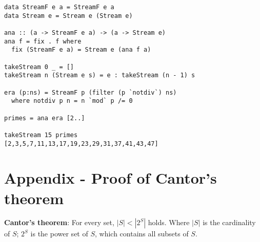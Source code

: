 \documentclass{article}
\begin{document}
\lstset{frame=single, language=Haskell}
\begin{lstlisting}
data StreamF e a = StreamF e a
data Stream e = Stream e (Stream e)

ana :: (a -> StreamF e a) -> (a -> Stream e)
ana f = fix . f where
  fix (StreamF e a) = Stream e (ana f a)

takeStream 0 _ = []
takeStream n (Stream e s) = e : takeStream (n - 1) s

era (p:ns) = StreamF p (filter (p `notdiv`) ns)
  where notdiv p n = n `mod` p /= 0

primes = ana era [2..]

takeStream 15 primes
[2,3,5,7,11,13,17,19,23,29,31,37,41,43,47]
\end{lstlisting}

\section{Appendix - Proof of Cantor's theorem}

\begin{theorem}
\textbf{Cantor's theorem}: For every set, $|S| < |2^S|$ holds. Where $|S|$ is the cardinality of $S$; $2^S$ is the power set of $S$, which contains all subsets of $S$.
\end{theorem}
\end{document}
